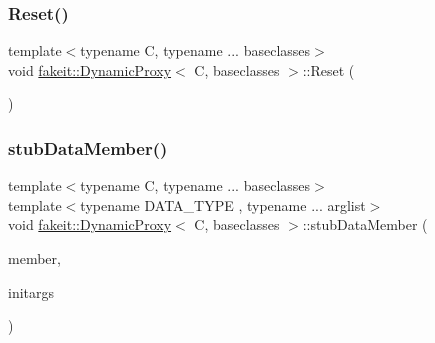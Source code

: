 \mbox{\label{structfakeit_1_1DynamicProxy_a8f00dd7c68a247f715ec3925f662de9f}} 
\subsubsection{\texorpdfstring{Reset()}{Reset()}\hspace{0.1cm}{\footnotesize\ttfamily [9/9]}}
{\footnotesize\ttfamily template$<$typename C, typename ... baseclasses$>$ \\
void \mbox{\hyperlink{structfakeit_1_1DynamicProxy}{fakeit\+::\+Dynamic\+Proxy}}$<$ C, baseclasses $>$\+::Reset (\begin{DoxyParamCaption}{ }\end{DoxyParamCaption})\hspace{0.3cm}{\ttfamily [inline]}}

\mbox{\label{structfakeit_1_1DynamicProxy_a872480e95dba48c6e690fb7cdc017f9d}} 
\subsubsection{\texorpdfstring{stubDataMember()}{stubDataMember()}\hspace{0.1cm}{\footnotesize\ttfamily [1/9]}}
{\footnotesize\ttfamily template$<$typename C, typename ... baseclasses$>$ \\
template$<$typename D\+A\+T\+A\+\_\+\+T\+Y\+PE , typename ... arglist$>$ \\
void \mbox{\hyperlink{structfakeit_1_1DynamicProxy}{fakeit\+::\+Dynamic\+Proxy}}$<$ C, baseclasses $>$\+::stub\+Data\+Member (\begin{DoxyParamCaption}\item[{D\+A\+T\+A\+\_\+\+T\+Y\+PE C\+::$\ast$}]{member,  }\item[{const arglist \&...}]{initargs }\end{DoxyParamCaption})\hspace{0.3cm}{\ttfamily [inline]}}


